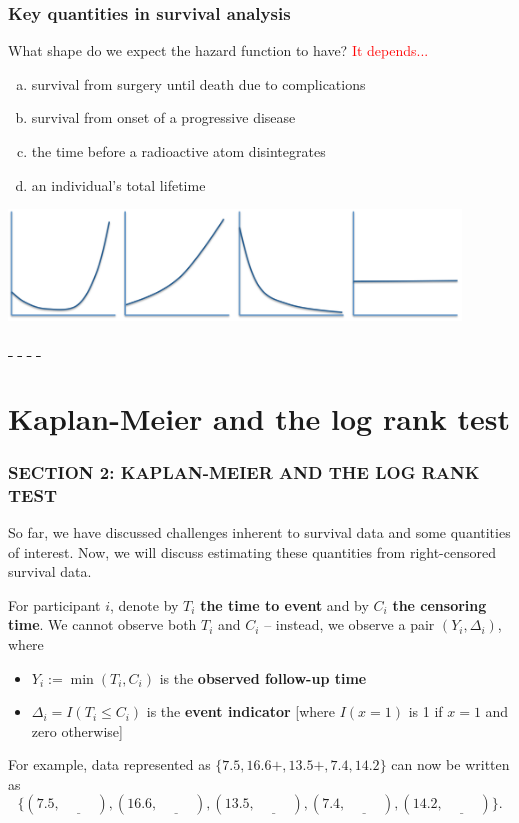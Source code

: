 \documentclass[12pt, 
hyperref={colorlinks=true, linkcolor=blue, urlcolor=cyan},dvipsnames]{beamer}
\begin{document}
\begin{frame}
\frametitle{Key quantities in survival analysis}
What shape do we expect the hazard function to have? \textcolor{red}{It depends...}
\begin{enumerate}[(a)]
\item survival from surgery until death due to complications
\item survival from onset of a progressive disease
\item the time before a radioactive atom disintegrates
\item an individual's total lifetime
\end{enumerate}
\begin{center}
\includegraphics[width = 0.9\textwidth]{figs/hazard_examples.png}

\underline{\,\phantom{right}\,} \hspace{1.5cm} \underline{\,\phantom{right}\,} \hspace{1.5cm} \underline{\,\phantom{right}\,} \hspace{1.5cm} \underline{\,\phantom{right}\,}
\end{center}
\end{frame}

\section{Kaplan-Meier and the log rank test}
\begin{frame}
\frametitle{SECTION 2: KAPLAN-MEIER AND THE LOG RANK TEST}

So far, we have discussed challenges inherent to survival data and some quantities of interest. Now, we will discuss estimating these quantities from right-censored survival data.

For participant $i$, denote by $T_i$ \textbf{the time to event} and by $C_i$ \textbf{the censoring time}. \pause We cannot observe both $T_i$ and $C_i$ -- instead, we observe a pair $(Y_i, \Delta_i)$, where \pause \vspace{-0.3cm}
\begin{itemize}
\item $Y_i := \min(T_i, C_i)$ is the \textbf{observed follow-up time} \pause
\item $\Delta_i = I(T_i \leq C_i)$ is the \textbf{event indicator} [where $I(x = 1)$ is 1 if $x = 1$ and zero otherwise] \pause
\end{itemize}

For example, data represented as $\{7.5, 16.6+, 13.5+, 7.4, 14.2\}$ can now be written as
\[\{(7.5, \underline{\,\phantom{right}\,}), (16.6, \underline{\,\phantom{right}\,}), (13.5, \underline{\,\phantom{right}\,}), (7.4, \underline{\,\phantom{right}\,}), (14.2, \underline{\,\phantom{right}\,})\}.\]
\end{frame}
\end{document}
